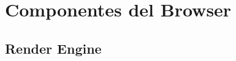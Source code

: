\label{chap:chap3}










\section{Componentes del Browser}
\label{sec:chap3.1}

\subsection{Render Engine}
\label{sec:chap3.1.1}
%

